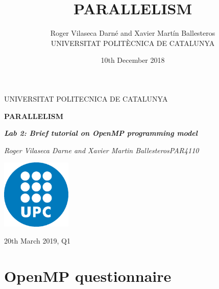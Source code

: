 \documentclass[12pt, a4paper]{article}
\title{PARALLELISM}
\author{Roger Vilaseca Darné and Xavier Martín Ballesteros\\
  \small UNIVERSITAT POLITÈCNICA DE CATALUNYA\\
}
\date{10th December 2018}
\begin{document}
\graphicspath{ {./lab2/images} }


\begin{titlepage}
	\centering
	\vspace{1cm}
	{\scshape\Large UNIVERSITAT POLITECNICA DE CATALUNYA\par}
	\vspace{1.5cm}
	{\huge\bfseries PARALLELISM\par}
	\vspace{2cm}
	{\Large\itshape \textbf{Lab 2: Brief tutorial on OpenMP programming model}\par}
	\vfill
	{\Large\itshape Roger Vilaseca Darne and Xavier Martin Ballesteros\break PAR4110\par}
	\vfill
	\includegraphics[width=0.25\textwidth]{./images/UPC.png}\par\vspace{1cm}

	\vfill

	{\large 20th March 2019, Q1}
\end{titlepage}


\setcounter{secnumdepth}{5}
\setcounter{tocdepth}{5}

\newpage
  \tableofcontents
\newpage


\section{OpenMP questionnaire}
\end{document}
